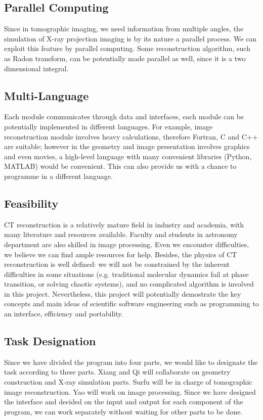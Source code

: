 \documentclass[11]{article}
\begin{document}
\subsection{Parallel Computing}
	Since in tomographic imaging, we need information from multiple angles, the simulation of X-ray projection imaging is by its nature a parallel process. We can exploit this feature by parallel computing. Some reconstruction algorithm, such as Radon transform, can be potentially made parallel as well, since it is a two dimensional integral.

\subsection{Multi-Language}
	Each module communicates through data and interfaces, each module can be potentially implemented in different languages. For example, image reconstruction module involves heavy calculations, therefore Fortran, C and C++ are suitable; however in the geometry and image presentation involves graphics and even movies, a high-level language with many convenient libraries (Python, MATLAB) would be convenient. This can also provide us with a chance to programme in a different language.

\subsection{Feasibility}
	CT reconstruction is a relatively mature field in industry and academia, with many literature and resources available. Faculty and students in astronomy department are also skilled in image processing. Even we encounter difficulties, we believe we can find ample resources for help. Besides, the physics of CT reconstruction is well defined: we will not be constrained by the inherent difficulties in some situations (e.g. traditional molecular dynamics fail at phase transition, or solving chaotic systems), and no complicated algorithm is involved in this project. Nevertheless, this project will potentially demostrate the key concepts and main ideas of scientific software engineering such as programming to an interface, efficiency and portability.
	

\subsection{Task Designation}
Since we have divided the program into four parts, we would like to designate the task according to these parts. Xiang and Qi will collaborate on geometry construction and X-ray simulation parts. Surfu will be in charge of tomographic image reconstruction. Yao will work on image processing. Since we have designed the interface and decided on the input and output for each component of the program, we can work separately without waiting for other parts to be done.
\end{document}
